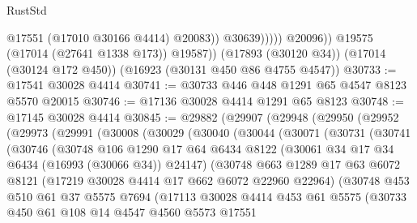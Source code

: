 \begin{lexlean}{RustStd}
\begin{coremodule}
                          @17551
                          (@17010 @30166 @4414)
                          @20083))
                      @30639)))))
            @20096))
        @19575
        (@17014 (@27641 @1338 @173))
        @19587))
    (@17893 (@30120 @34))
    (@17014 (@30124 @172 @450))
    (@16923 (@30131 @450 @86 @4755 @4547))
@30733 := @17541 @30028 @4414
@30741 := @30733 @446 @448 @1291 @65 @4547 @8123 @5570 @20015
@30746 := @17136 @30028 @4414 @1291 @65 @8123
@30748 := @17145 @30028 @4414
@30845 := @29882
    (@29907
      (@29948
        (@29950
          (@29952
            (@29973
              (@29991
                (@30008
                  (@30029
                    (@30040
                      (@30044
                        (@30071
                          (@30731
                            (@30741
                              (@30746
                                (@30748
                                  @106
                                  @1290
                                  @17
                                  @64
                                  @6434
                                  @8122
                                  (@30061 @34 @17 @34 @6434 (@16993 (@30066 @34)) @24147)
                                  (@30748
                                    @663
                                    @1289
                                    @17
                                    @63
                                    @6072
                                    @8121
                                    (@17219 @30028 @4414 @17 @662 @6072 @22960 @22964)
                                    (@30748
                                      @453
                                      @510
                                      @61
                                      @37
                                      @5575
                                      @7694
                                      (@17113
                                        @30028
                                        @4414
                                        @453
                                        @61
                                        @5575
                                        (@30733
                                          @450
                                          @61
                                          @108
                                          @14
                                          @4547
                                          @4560
                                          @5573
                                          @17551

\end{coremodule}
\end{lexlean}
